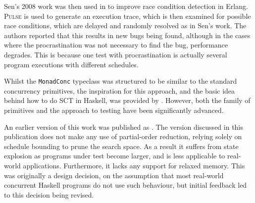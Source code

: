 Sen's 2008 work was then used in \citep{procrastination} to improve
race condition detection in Erlang. \textsc{Pulse} is used to generate
an execution trace, which is then examined for possible race
conditions, which are delayed and randomly resolved as in Sen's
work. The authors reported that this results in new bugs being found,
although in the cases where the procrastination was not necessary to
find the bug, performance degrades. This is because one test with
procrastination is actually several program executions with different
schedules.






Whilst the \verb|MonadConc| typeclass was structured to be similar to
the standard concurrency primitives, the inspiration for this
approach, and the basic idea behind how to do SCT in Haskell, was
provided by \citep{typeclass}. However, both the family of primitives
and the approach to testing have been significantly advanced.


An earlier version of this work was published as \citep{dejafu}. The
version discussed in this publication does not make any use of
partial-order reduction, relying solely on schedule bounding to prune
the search space. As a result it suffers from state explosion as
programs under test become larger, and is less applicable to
real-world applications. Furthermore, it lacks any support for relaxed
memory. This was originally a design decision, on the assumption that
most real-world concurrent Haskell programs do not use such behaviour,
but initial feedback led to this decision being revised.
